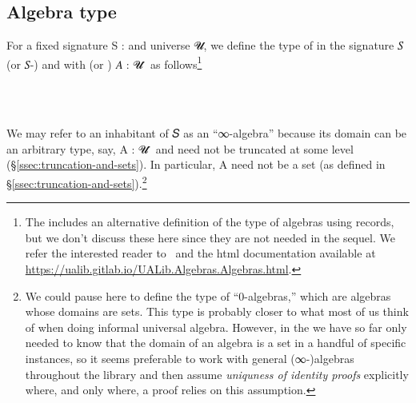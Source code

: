 \documentclass[a4paper,UKenglish,cleveref,autoref,thm-restate]{lipics-v2021}
\begin{document}
\subsection{Algebra type}\label{ssec:algebra-type}
For a fixed signature \ab S \as : \sigOV and universe \ab 𝓤, we define the type of  in the signature \ab 𝑆 (or \ab 𝑆-) and with  (or ) \ab 𝐴 \as : \ab 𝓤 \as ̇ as follows\footnote{The \agdaualib includes an alternative definition of the type of algebras using records, but we don't discuss these here since they are not needed in the sequel. We refer the interested reader to~\cite{DeMeo:2021} and the html documentation available at \url{https://ualib.gitlab.io/UALib.Algebras.Algebras.html}.}
\ccpad
\begin{code}%
\>[0]\AgdaSpace{}%
\AgdaSymbol{:}\AgdaSpace{}%
\AgdaSymbol{(}\AgdaSpace{}%
\AgdaSymbol{:}\AgdaSpace{}%
\AgdaSymbol{)(}\AgdaSpace{}%
\AgdaSymbol{:}\AgdaSpace{}%
\AgdaSpace{}%
\AgdaSpace{}%
\AgdaSymbol{)}\AgdaSpace{}%
%
\>[50]\AgdaSpace{}%
\AgdaSpace{}%
\AgdaSpace{}%
\AgdaSpace{}%
\AgdaSpace{}%
\AgdaSpace{}%
\<%
\\
%
\\[\AgdaEmptyExtraSkip]%
\>[0]\AgdaSpace{}%
%
\>[13]\AgdaSpace{}%
\AgdaSymbol{=}\AgdaSpace{}%
\AgdaSpace{}%
\AgdaSpace{}%
\AgdaSpace{}%
\AgdaSpace{}%
\AgdaSpace{}%
\AgdaFunction{,}\AgdaSpace{}%
\AgdaSymbol{((}\AgdaSpace{}%
\AgdaSymbol{:}\AgdaSpace{}%
\AgdaSpace{}%
\AgdaSpace{}%
\AgdaSymbol{)}\AgdaSpace{}%
\AgdaSpace{}%
\AgdaSpace{}%
\AgdaSymbol{(}\AgdaSpace{}%
\AgdaSpace{}%
\AgdaSpace{}%
\AgdaSymbol{)}\AgdaSpace{}%
\AgdaSymbol{)}\<%
\end{code}
\ccpad
We may refer to an inhabitant of  \ab 𝑆  as an ``∞-algebra'' because its domain can be an arbitrary type, say, \ab A \as : \ab 𝓤 \af ̇ and need not be truncated at some level (\S\ref{ssec:truncation-and-sets}). In particular, \ab A need not be a set (as defined in \S\ref{ssec:truncation-and-sets}).\footnote{We could pause here to define the type of ``0-algebras,'' which are algebras whose domains are sets. This type is probably closer to what most of us think of when doing informal universal algebra. However, in the \ualib we have so far only needed to know that the domain of an algebra is a set in a handful of specific instances, so it seems preferable to work with general (∞-)algebras throughout the library and then assume \emph{uniquness of identity proofs} explicitly where, and only where, a proof relies on this assumption.}
\end{document}
